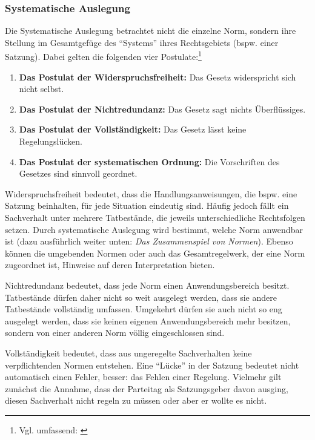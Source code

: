 \subsubsection{Systematische Auslegung}
\label{Normenauslegung:Auslegung:Methoden:Systematisch}
Die Systematische Auslegung betrachtet nicht die einzelne Norm, sondern ihre Stellung im Gesamtgefüge des \enquote{Systems} ihres Rechtsgebiets (bspw. einer Satzung).
Dabei gelten die folgenden vier Postulate:\footnote{Vgl. umfassend: \cite[S.~66~ff.]{Puppe2008}}
\begin{enumerate}
\item \textbf{Das Postulat der Widerspruchsfreiheit:} Das Gesetz widerspricht sich nicht selbst.
\item \textbf{Das Postulat der Nichtredundanz:} Das Gesetz sagt nichts Überflüssiges.
\item \textbf{Das Postulat der Vollständigkeit:} Das Gesetz lässt keine Regelungslücken.
\item \textbf{Das Postulat der systematischen Ordnung:} Die Vorschriften des Gesetzes sind sinnvoll geordnet.
\end{enumerate}

Widerspruchsfreiheit bedeutet, dass die Handlungsanweisungen, die bspw. eine Satzung beinhalten, für jede Situation eindeutig sind.
Häufig jedoch fällt ein Sachverhalt unter mehrere Tatbestände, die jeweils unterschiedliche Rechtsfolgen setzen.
Durch systematische Auslegung wird bestimmt, welche Norm anwendbar ist (dazu ausführlich weiter unten: \emph{Das Zusammenspiel von Normen}).
Ebenso können die umgebenden Normen oder auch das Gesamtregelwerk, der eine Norm zugeordnet ist, Hinweise auf deren Interpretation bieten.

Nichtredundanz bedeutet, dass jede Norm einen Anwendungsbereich besitzt.
Tatbestände dürfen daher nicht so weit ausgelegt werden, dass sie andere Tatbestände vollständig umfassen.
Umgekehrt dürfen sie auch nicht so eng ausgelegt werden, dass sie keinen eigenen Anwendungsbereich mehr besitzen, sondern von einer anderen Norm völlig eingeschlossen sind.

Vollständigkeit bedeutet, dass aus ungeregelte Sachverhalten keine verpflichtenden Normen entstehen.
Eine \enquote{Lücke} in der Satzung bedeutet nicht automatisch einen Fehler, besser: das Fehlen einer Regelung.
Vielmehr gilt zunächst die Annahme, dass der Parteitag als Satzungsgeber davon ausging, diesen Sachverhalt nicht regeln zu müssen oder aber er wollte es nicht.

